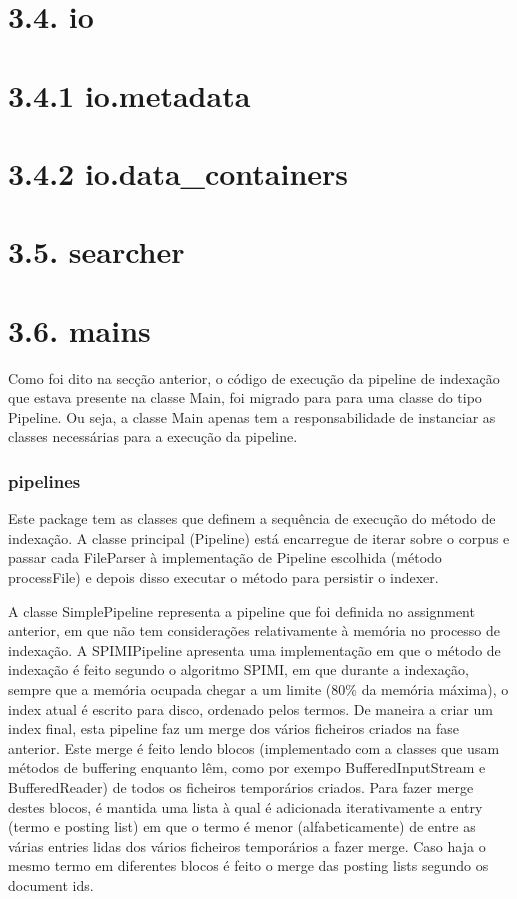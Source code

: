 \documentclass[12pt]{article}
\begin{document}
\section*{3.4. io}
\section*{3.4.1 io.metadata}
\section*{3.4.2 io.data\_containers}
\section*{3.5. searcher}
\section*{3.6. mains}


Como foi dito na secção anterior, o código de execução da pipeline
de indexação que estava presente na classe Main, foi migrado para
para uma classe do tipo Pipeline. Ou seja, a classe Main apenas
tem a responsabilidade de instanciar as classes necessárias para
a execução da pipeline.

\subsubsection{pipelines}

Este package tem as classes que definem a sequência de execução
do método de indexação. A classe principal (Pipeline) está encarregue
de iterar sobre o corpus e passar cada FileParser à implementação
de Pipeline escolhida (método processFile) e depois disso executar
o método para persistir o indexer.

A classe SimplePipeline representa a pipeline que foi definida no
assignment anterior, em que não tem considerações relativamente à
memória no processo de indexação. A SPIMIPipeline apresenta uma
implementação em que o método de indexação é feito segundo o
algoritmo SPIMI, em que durante a indexação, sempre que a memória
ocupada chegar a um limite (80\% da memória máxima), o index atual
é escrito para disco, ordenado pelos termos. De maneira a criar um index
final, esta pipeline faz um merge dos vários ficheiros criados na
fase anterior. Este merge é feito lendo blocos (implementado com a
classes que usam métodos de buffering enquanto lêm, como por exempo
BufferedInputStream e BufferedReader) de todos os ficheiros temporários
criados. Para fazer merge destes blocos, é mantida uma lista à qual é
adicionada iterativamente a entry (termo e posting list) em que o termo é
menor (alfabeticamente) de entre as várias entries lidas dos vários
ficheiros temporários a fazer merge. Caso haja o mesmo termo em
diferentes blocos é feito o merge das posting lists segundo os
document ids.
\end{document}
